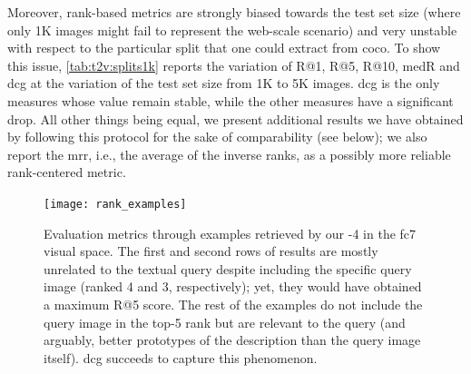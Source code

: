 Moreover, rank-based metrics are strongly biased towards the test set size (where only 1K images might fail to represent the web-scale scenario) and very unstable with respect to the particular split that one could extract from \gls{coco}.
To show this issue, \ref{tab:t2v:splits1k} reports the variation of R@1, R@5, R@10, \gls{medR} and \gls{dcg} at the variation of the test set size from 1K to 5K images.
\gls{dcg} is the only measures whose value remain stable, while the other measures have a significant drop.
All other things being equal, we present additional results we have obtained by following this protocol for the sake of comparability (see below);
we also report the \acrfull{mrr}, i.e.,  the average of the inverse ranks, as a possibly more reliable rank-centered metric.

\begin{figure}
    \texttt{[image: rank\_examples]}
    \caption{Evaluation metrics through examples retrieved by our \widedeepttv{}-4 in the fc7 visual space.
    The first and second rows of results are mostly unrelated to the textual query despite including the specific query image (ranked 4 and 3, respectively);
    yet, they would have obtained a maximum R@5 score.
    The rest of the examples do not include the query image in the top-5 rank but are relevant to the query (and arguably, better prototypes of the description than the query image itself).
    \gls{dcg} succeeds to capture this phenomenon.}
    \label{fig:t2v:metrics}
\end{figure}

